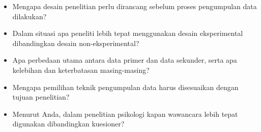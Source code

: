 \documentclass[
  indonesian,
  letterpaper,
  DIV=11,
  numbers=noendperiod]{scrreprt}
\providecommand{\tightlist}{%
  \setlength{\itemsep}{0pt}\setlength{\parskip}{0pt}}
\begin{document}
\begin{tcolorbox}[enhanced jigsaw, colframe=quarto-callout-important-color-frame, toptitle=1mm, breakable, leftrule=.75mm, arc=.35mm, toprule=.15mm, colback=white, colbacktitle=quarto-callout-important-color!10!white, bottomtitle=1mm, bottomrule=.15mm, titlerule=0mm, title=\textcolor{quarto-callout-important-color}{\faExclamation}\hspace{0.5em}{Refleksi \& Diskusi}, coltitle=black, left=2mm, opacitybacktitle=0.6, opacityback=0, rightrule=.15mm]

\begin{itemize}
\tightlist
\item
  Mengapa desain penelitian perlu dirancang sebelum proses pengumpulan
  data dilakukan?
\item
  Dalam situasi apa peneliti lebih tepat menggunakan desain
  eksperimental dibandingkan desain non-eksperimental?
\item
  Apa perbedaan utama antara data primer dan data sekunder, serta apa
  kelebihan dan keterbatasan masing-masing?
\item
  Mengapa pemilihan teknik pengumpulan data harus disesuaikan dengan
  tujuan penelitian?
\item
  Menurut Anda, dalam penelitian psikologi kapan wawancara lebih tepat
  digunakan dibandingkan kuesioner?
\end{itemize}

\end{tcolorbox}
\end{document}
